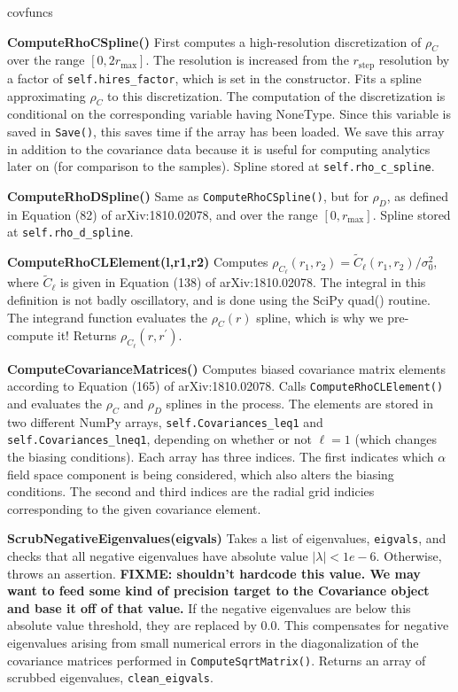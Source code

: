 \documentclass[10pt,a4paper]{article}
\begin{document}
\begin{labeling}{covfuncs}
	\item[\textbf{ComputeRhoCSpline()}] First computes a high-resolution discretization of $\rho_C$  over the range $[0,2r_\text{max}]$. The resolution is increased from the $r_\text{step}$ resolution by a factor of \verb|self.hires_factor|, which is set in the constructor. Fits a spline approximating $\rho_C$ to this discretization. The computation of the discretization is conditional on the corresponding variable having NoneType. Since this variable is saved in \verb|Save()|, this saves time if the array has been loaded. We save this array in addition to the covariance data because it is useful for computing analytics later on (for comparison to the samples). Spline stored at \verb|self.rho_c_spline|.
	
	\item[\textbf{ComputeRhoDSpline()}] Same as \verb|ComputeRhoCSpline()|, but for $\rho_D$, as defined in Equation (82) of arXiv:1810.02078, and over the range $[0,r_\text{max}]$. Spline stored at \verb|self.rho_d_spline|.
	
	\item[\textbf{ComputeRhoCLElement(l,r1,r2)}] Computes $\rho_{C_\ell}(r_1,r_2) = \tilde{C}_\ell(r_1,r_2)/\sigma_0^2$, where  $\tilde{C}_\ell$ is given in Equation (138) of arXiv:1810.02078. The integral in this definition is not badly oscillatory, and is done using the SciPy quad() routine. The integrand function evaluates the $\rho_C(r)$ spline, which is why we pre-compute it! Returns $\rho_{C_\ell}(r,r^\prime)$.
	
	\item[\textbf{ComputeCovarianceMatrices()}] Computes biased covariance matrix elements according to Equation (165) of arXiv:1810.02078. Calls \verb|ComputeRhoCLElement()| and evaluates the $\rho_C$ and $\rho_D$ splines in the process. The elements are stored in two different NumPy arrays, \verb|self.Covariances_leq1| and \verb|self.Covariances_lneq1|, depending on whether or not $\ell=1$ (which changes the biasing conditions). Each array has three indices. The first indicates which $\alpha$ field space component is being considered, which also alters the biasing conditions. The second and third indices are the radial grid indicies corresponding to the given covariance element.
	
	\item[\textbf{ScrubNegativeEigenvalues(eigvals)}] Takes a list of eigenvalues, \verb|eigvals|, and checks that all negative eigenvalues have absolute value $|\lambda|<1e-6$. Otherwise, throws an assertion. \textbf{FIXME: shouldn't hardcode this value. We may want to feed some kind of precision target to the Covariance object and base it off of that value.} If the negative eigenvalues are below this absolute value threshold, they are replaced by $0.0$. This compensates for negative eigenvalues arising from small numerical errors in the diagonalization of the covariance matrices performed in \verb|ComputeSqrtMatrix()|. Returns an array of scrubbed eigenvalues, \verb|clean_eigvals|.
	

\end{labeling}
\end{document}
